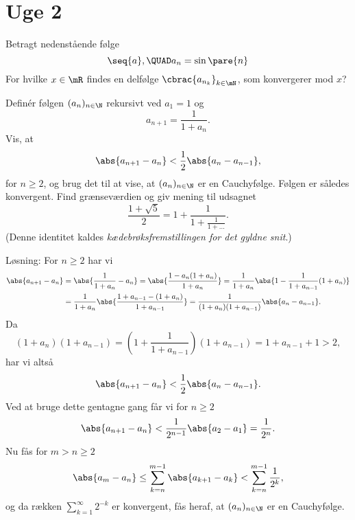 \section{Uge 2}
\begin{opg} 
Betragt nedenstående følge
$$ \seq{a}, \QUAD a_n = \sin\pare{n} $$
For hvilke $x\in\mR$ findes en delfølge $\cbrac{a_{n_k}}_{k\in\mN}$, som konvergerer mod $x$?
\end{opg}

	\begin{opg}
		Definér følgen $(a_n)_{n\in\N}$ rekursivt ved $a_1 = 1$ og 
		$$
		a_{n+1} = \frac{1}{1 + a_n}.
		$$
		Vis, at
			$$
			\abs{a_{n+1} - a_n} < \frac{1}{2}\abs{a_n - a_{n-1}},
			$$
			for $n \geq 2$, og brug det til at vise, at $(a_n)_{n\in\N}$ er en Cauchyfølge. Følgen er således konvergent. Find grænseværdien og giv mening til udsagnet
			$$
			\frac{1 + \sqrt{5}}{2} = 1 + \frac{1}{1 + \frac{1}{1 + \dots}}.
			$$
			(Denne identitet kaldes \emph{kædebrøksfremstillingen for det gyldne snit}.)
	\end{opg}
	Løsning: For $n \geq 2$ har vi
	\begin{align*}
	\abs{a_{n+1} - a_n} &= \abs{\frac{1}{1 + a_n} - a_n} 
	= \abs{\frac{1 - a_n(1 + a_n)}{1 + a_n}} 
	= \frac{1}{1 + a_n}\abs{1 - \frac{1}{1 + a_{n-1}}(1 + a_n)} 
	\\&= \frac{1}{1 + a_n}\abs{\frac{1 + a_{n-1} - (1 + a_n)}{1 + a_{n-1}}} = \frac{1}{(1 + a_n)(1 + a_{n-1})}\abs{a_n - a_{n-1}}.
	\end{align*}
	Da
	$$
	(1 + a_n)(1 + a_{n-1}) = (1 + \frac{1}{1 + a_{n-1}})(1 + a_{n-1}) = 1 + a_{n-1} + 1 > 2,
	$$
	har vi altså
	$$
	\abs{a_{n+1} - a_n} < \frac{1}{2}\abs{a_n - a_{n-1}}.
	$$
	Ved at bruge dette gentagne gang får vi for $n \geq 2$
	$$
	\abs{a_{n+1} - a_n} < \frac{1}{2^{n-1}}\abs{a_2 - a_1} = \frac{1}{2^n}.
	$$
	Nu fås for $m > n \geq 2$
	$$
	\abs{a_m - a_n} \leq \sum_{k = n}^{m-1} \abs{a_{k+1} - a_k} < \sum_{k = n}^{m-1} \frac{1}{2^k},
	$$
	og da rækken $\sum_{k = 1}^{\infty} 2^{-k}$ er konvergent, fås heraf, at $(a_n)_{n\in\N}$ er en Cauchyfølge.
	
